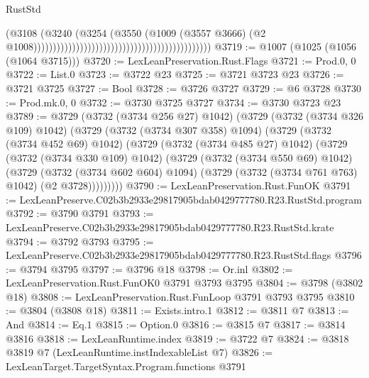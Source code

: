 \begin{lexlean}{RustStd}
\begin{coremodule}
                                                                                    (@3108
                                                                                      (@3240
                                                                                        (@3254
                                                                                          (@3550
                                                                                            (@1009
                                                                                              (@3557
                                                                                                @3666)
                                                                                              (@2
                                                                                                @1008))))))))))))))))))))))))))))))))))))))))))))))
@3719 := @1007 (@1025 (@1056 (@1064 @3715)))
@3720 := LexLeanPreservation.Rust.Flags
@3721 := Prod.{0, 0}
@3722 := List.{0}
@3723 := @3722 @23
@3725 := @3721 @3723 @23
@3726 := @3721 @3725
@3727 := Bool
@3728 := @3726 @3727
@3729 := @6 @3728
@3730 := Prod.mk.{0, 0}
@3732 := @3730 @3725 @3727
@3734 := @3730 @3723 @23
@3789 := @3729
    (@3732 (@3734 @256 @27) @1042)
    (@3729
      (@3732 (@3734 @326 @109) @1042)
      (@3729
        (@3732 (@3734 @307 @358) @1094)
        (@3729
          (@3732 (@3734 @452 @69) @1042)
          (@3729
            (@3732 (@3734 @485 @27) @1042)
            (@3729
              (@3732 (@3734 @330 @109) @1042)
              (@3729
                (@3732 (@3734 @550 @69) @1042)
                (@3729
                  (@3732 (@3734 @602 @604) @1094)
                  (@3729 (@3732 (@3734 @761 @763) @1042) (@2 @3728)))))))))
@3790 := LexLeanPreservation.Rust.FunOK
@3791 := LexLeanPreserve.C02b3b2933e29817905bdab0429777780.R23.RustStd.program
@3792 := @3790 @3791
@3793 := LexLeanPreserve.C02b3b2933e29817905bdab0429777780.R23.RustStd.krate
@3794 := @3792 @3793
@3795 := LexLeanPreserve.C02b3b2933e29817905bdab0429777780.R23.RustStd.flags
@3796 := @3794 @3795
@3797 := @3796 @18
@3798 := Or.inl
@3802 := LexLeanPreservation.Rust.FunOK0 @3791 @3793 @3795
@3804 := @3798 (@3802 @18)
@3808 := LexLeanPreservation.Rust.FunLoop @3791 @3793 @3795
@3810 := @3804 (@3808 @18)
@3811 := Exists.intro.{1}
@3812 := @3811 @7
@3813 := And
@3814 := Eq.{1}
@3815 := Option.{0}
@3816 := @3815 @7
@3817 := @3814 @3816
@3818 := LexLeanRuntime.index
@3819 := @3722 @7
@3824 := @3818 @3819 @7 (LexLeanRuntime.instIndexableList @7)
@3826 := LexLeanTarget.TargetSyntax.Program.functions @3791

\end{coremodule}
\end{lexlean}
